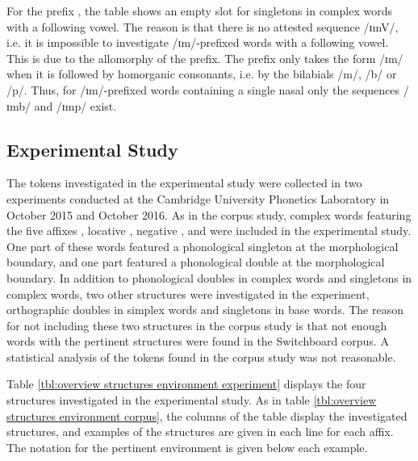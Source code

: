 For the prefix , the table shows an empty slot for singletons in complex words with a following vowel. The reason is that there is no attested sequence /ɪmV/, i.e. it is impossible to investigate /ɪm/-prefixed words with a following vowel. This is due to the allomorphy of the prefix. The prefix  only takes the form /ɪm/ when it is followed by homorganic consonants, i.e. by the bilabials /m/, /b/ or /p/. Thus, for /ɪm/-prefixed words containing a single nasal only the sequences /ɪmb/ and /ɪmp/ exist. 



\subsection{Experimental Study}\label{experiment data composition}

The tokens investigated in the experimental study were collected in two experiments conducted at the Cambridge University Phonetics Laboratory in October 2015 and October 2016. 
 As in the corpus study, complex words featuring the five affixes , locative , negative ,  and  were included  in the experimental study. One part of these words featured a phonological singleton at the morphological boundary, and one part  featured a phonological double at the morphological boundary. In addition to phonological doubles in complex words and singletons in complex words, two other structures were investigated in the experiment, orthographic doubles in simplex words and singletons in base words. The reason for not including these two structures in the corpus study is that not enough words with the pertinent structures were found in the Switchboard corpus. A statistical analysis of the tokens found in the corpus study was not reasonable.
 
 Table \ref{tbl:overview structures environment experiment} displays the four structures investigated in the experimental study. As in table \ref{tbl:overview structures environment corpus}, the columns of the table display the investigated structures, and examples of the structures are given in each line for each affix. The notation for the pertinent environment is given below each example. 
 
 

